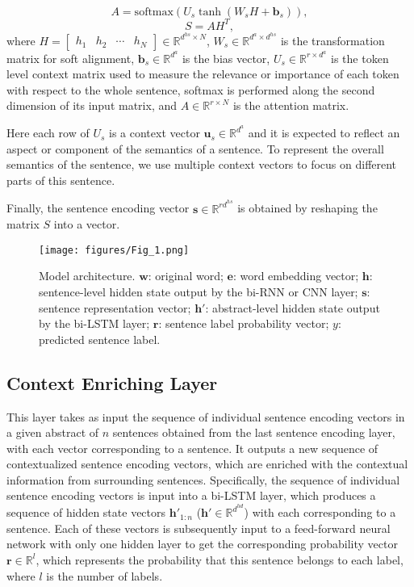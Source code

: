 \documentclass[11pt,a4paper]{article}
\renewcommand{\vec}{\boldsymbol}
\begin{document}
\begin{equation}
A = \text{softmax}(U_s\tanh(W_sH+\vec{b}_s)),
\end{equation}
\begin{equation}
S=AH^T,
\end{equation}
where $H=\begin{bmatrix} h_1 & h_2 & \cdots & h_N\end{bmatrix}\in \mathbb{R}^{d^{hs}\times N}$, $W_s\in \mathbb{R}^{d^a \times d^{hs}}$ is the transformation matrix for soft alignment, $\vec{b}_s\in \mathbb{R}^{d^a}$ is the bias vector, $U_s\in \mathbb{R}^{r \times d^{a}}$ is the token level context matrix used to measure the relevance or importance of each token with respect to the whole sentence, softmax is performed along the second dimension of its input matrix, and $A\in \mathbb{R}^{r \times N}$ is the attention matrix.

Here each row of $U_s$ is a context vector $\vec{u}_s\in \mathbb{R}^{d^{a}}$ and it is expected to reflect an aspect or component of the semantics of a sentence. To represent the overall semantics of the sentence, we use multiple context vectors to focus on different parts of this sentence. 


Finally, the sentence encoding vector $\vec{s}\in \mathbb{R}^{rd^{hs}}$ is obtained by reshaping the matrix $S$ into a vector.

\begin{figure}[h!]
\begin{center}
\texttt{[image: figures/Fig\_1.png]}
\caption{Model architecture. $\vec{w}$: original word; $\vec{e}$: word embedding vector; $\vec{h}$: sentence-level hidden state output by the bi-RNN or CNN layer; $\vec{s}$: sentence representation vector; $\vec{h'}$: abstract-level hidden state output by the bi-LSTM layer; $\vec{r}$: sentence label probability vector; $y$: predicted sentence label.}
\label{figure:model}
\end{center}
\end{figure}

\subsection{Context Enriching Layer}

This layer takes as input the sequence of individual sentence encoding vectors in a given abstract of $n$ sentences obtained from the last sentence encoding layer, with each vector corresponding to a sentence. It outputs a new sequence of contextualized sentence encoding vectors, which are enriched with the contextual information from surrounding sentences. Specifically, the sequence of individual sentence encoding vectors is input into a bi-LSTM layer, which produces a sequence of hidden state vectors $\vec{h'}_{1:n}$ ($\vec{h'}\in \mathbb{R}^{d^{hd}}$) with each corresponding to a sentence. Each of these vectors is subsequently input to a feed-forward neural network with only one hidden layer to get the corresponding probability vector $\vec{r}\in \mathbb{R}^{l}$, which represents the probability that this sentence belongs to each label, where $l$ is the number of labels.
\end{document}
